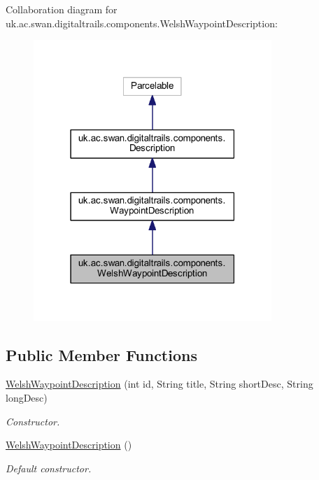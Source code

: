 Collaboration diagram for uk.\+ac.\+swan.\+digitaltrails.\+components.\+Welsh\+Waypoint\+Description\+:\nopagebreak
\begin{figure}[H]
\begin{center}
\leavevmode
\includegraphics[width=255pt]{classuk_1_1ac_1_1swan_1_1digitaltrails_1_1components_1_1_welsh_waypoint_description__coll__graph}
\end{center}
\end{figure}
\subsection*{Public Member Functions}
\begin{DoxyCompactItemize}
\item 
\hyperlink{classuk_1_1ac_1_1swan_1_1digitaltrails_1_1components_1_1_welsh_waypoint_description_a07a7f668aae7c34106a807ec1f3220de}{Welsh\+Waypoint\+Description} (int id, String title, String short\+Desc, String long\+Desc)
\begin{DoxyCompactList}\small\item\em Constructor. \end{DoxyCompactList}\item 
\hyperlink{classuk_1_1ac_1_1swan_1_1digitaltrails_1_1components_1_1_welsh_waypoint_description_abc99397f6f008f179abb0a89ab8c26a9}{Welsh\+Waypoint\+Description} ()
\begin{DoxyCompactList}\small\item\em Default constructor. \end{DoxyCompactList}\end{DoxyCompactItemize}
